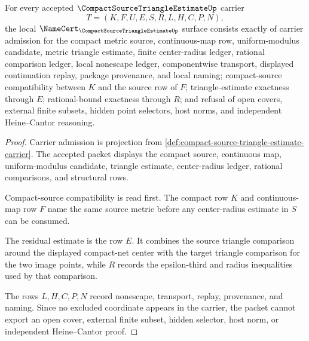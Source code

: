 \begin{theorem}
\label{thm:compact-source-triangle-estimate-namecert-obligations}
For every accepted $\CompactSourceTriangleEstimateUp$ carrier
$$
T=(K,F,U,E,S,R,L,H,C,P,N),
$$
the local $\NameCert_{\CompactSourceTriangleEstimateUp}$ surface consists exactly of carrier admission for the compact metric source, continuous-map row, uniform-modulus candidate, metric triangle estimate, finite center-radius ledger, rational comparison ledger, local nonescape ledger, componentwise transport, displayed continuation replay, package provenance, and local naming; compact-source compatibility between $K$ and the source row of $F$; triangle-estimate exactness through $E$; rational-bound exactness through $R$; and refusal of open covers, external finite subsets, hidden point selectors, host norms, and independent Heine--Cantor reasoning.
\end{theorem}
\begin{proof}
Carrier admission is projection from \autoref{def:compact-source-triangle-estimate-carrier}. The accepted packet displays the compact source, continuous map, uniform-modulus candidate, triangle estimate, center-radius ledger, rational comparisons, and structural rows.

Compact-source compatibility is read first. The compact row $K$ and continuous-map row $F$ name the same source metric before any center-radius estimate in $S$ can be consumed.

The residual estimate is the row $E$. It combines the source triangle comparison around the displayed compact-net center with the target triangle comparison for the two image points, while $R$ records the epsilon-third and radius inequalities used by that comparison.

The rows $L,H,C,P,N$ record nonescape, transport, replay, provenance, and naming. Since no excluded coordinate appears in the carrier, the packet cannot export an open cover, external finite subset, hidden selector, host norm, or independent Heine--Cantor proof.
\end{proof}

